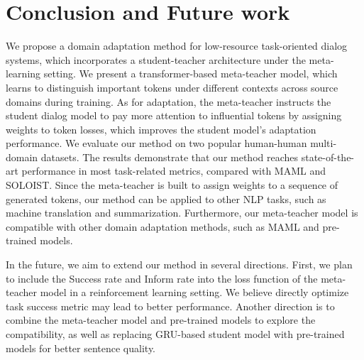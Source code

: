\documentclass[letterpaper]{article} %
\begin{document}


\section*{Conclusion and Future work}



We propose a domain adaptation method for low-resource task-oriented dialog systems, which incorporates a student-teacher architecture under the meta-learning setting.
%
We present a transformer-based meta-teacher model, which learns to distinguish important tokens under different contexts across source domains during training. As for adaptation, the meta-teacher instructs the student dialog model to pay more attention to influential tokens by assigning weights to token losses, which improves the student model's adaptation performance.
%
We evaluate our method on two popular human-human multi-domain datasets. 
%
The results demonstrate that our method reaches state-of-the-art performance in most task-related metrics, compared with MAML and SOLOIST. 
%
Since the meta-teacher is built to assign weights to a sequence of generated tokens, our method can be applied to other NLP tasks, such as machine translation and summarization.
%
Furthermore, our meta-teacher model is compatible with other domain adaptation methods, such as MAML and pre-trained models. 


In the future, we aim to extend our method in several directions. First, we plan to include the Success rate and Inform rate into the loss function of the meta-teacher model in a reinforcement learning setting. We believe directly optimize task success metric may lead to better performance. Another direction is to combine the meta-teacher model and pre-trained models to explore the compatibility, as well as replacing GRU-based student model with pre-trained models for better sentence quality.



\end{document}
